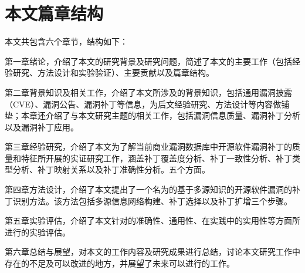 \section{本文篇章结构}
本文共包含六个章节，结构如下：

第一章绪论，介绍了本文的研究背景及研究问题，简述了本文的主要工作（包括经验研究、方法设计和实验验证）、主要贡献以及篇章结构。

第二章背景知识及相关工作，介绍了本文所涉及的背景知识，包括通用漏洞披露（CVE）、漏洞公告、漏洞补丁等信息，为后文经验研究、方法设计等内容做铺垫；本章还介绍了与本文研究主题的相关工作，包括漏洞信息质量、漏洞补丁分析以及漏洞补丁应用。

第三章经验研究，介绍了本文为了解当前商业漏洞数据库中开源软件漏洞补丁的质量和特征所开展的实证研究工作，涵盖补丁覆盖度分析、补丁一致性分析、补丁类型分析、补丁映射关系以及补丁准确性分析。五个方面。

第四章\tool 方法设计，介绍了本文提出了一个名为\tool 的基于多源知识的开源软件漏洞的补丁识别方法。该方法包括多源信息网络构建、补丁选择以及补丁扩增三个步骤。

第五章实验评估，介绍了本文针对\tool 的准确性、通用性、在实践中的实用性等方面所进行的实验评估。

第六章总结与展望，对本文的工作内容及研究成果进行总结，讨论本文研究工作中存在的不足及可以改进的地方，并展望了未来可以进行的工作。
